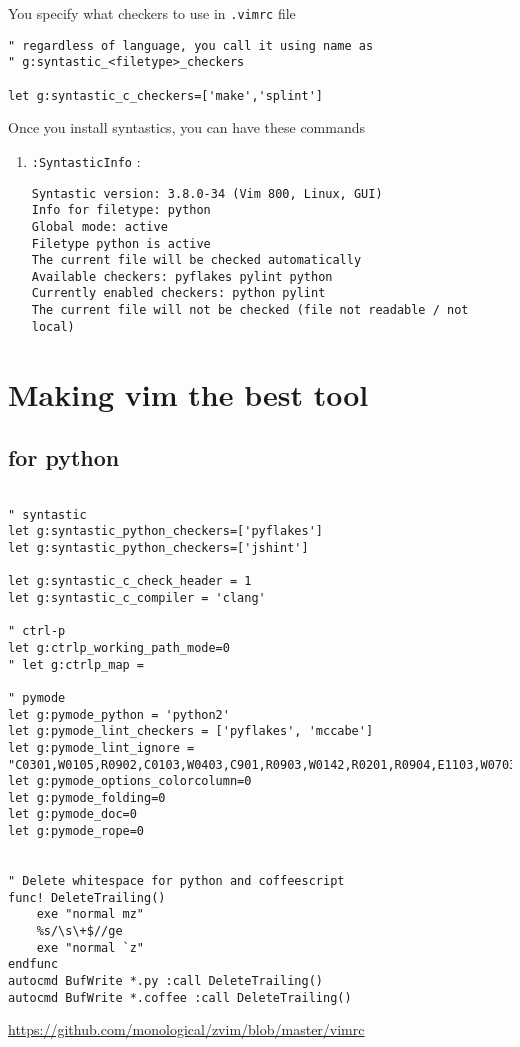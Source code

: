 You specify what checkers to use in \verb!.vimrc! file
\begin{verbatim}
" regardless of language, you call it using name as 
" g:syntastic_<filetype>_checkers

let g:syntastic_c_checkers=['make','splint']
\end{verbatim}

Once you install syntastics, you can have these commands

\begin{enumerate}
  \item \verb!:SyntasticInfo! : 

{\tiny 
\begin{verbatim}
Syntastic version: 3.8.0-34 (Vim 800, Linux, GUI)
Info for filetype: python
Global mode: active
Filetype python is active
The current file will be checked automatically
Available checkers: pyflakes pylint python
Currently enabled checkers: python pylint
The current file will not be checked (file not readable / not local)
\end{verbatim}
}  
  
  
\end{enumerate}

\section{Making vim the best tool}


\subsection{for python}
\begin{verbatim}

" syntastic
let g:syntastic_python_checkers=['pyflakes']
let g:syntastic_python_checkers=['jshint']

let g:syntastic_c_check_header = 1
let g:syntastic_c_compiler = 'clang'

" ctrl-p
let g:ctrlp_working_path_mode=0
" let g:ctrlp_map = 

" pymode
let g:pymode_python = 'python2'
let g:pymode_lint_checkers = ['pyflakes', 'mccabe']
let g:pymode_lint_ignore = "C0301,W0105,R0902,C0103,W0403,C901,R0903,W0142,R0201,R0904,E1103,W0703,W0221,C0323,E1101,R0914,E0611,F0401,R0915,E501,E203,W0232,W1001,W0122,W0511,W0104,R0912,W0621,W0223,W0201,W0612,C0302,I0011,R0901,W1201,W0622,R0913,E0702"
let g:pymode_options_colorcolumn=0
let g:pymode_folding=0
let g:pymode_doc=0
let g:pymode_rope=0


" Delete whitespace for python and coffeescript
func! DeleteTrailing()
    exe "normal mz"
    %s/\s\+$//ge
    exe "normal `z"
endfunc
autocmd BufWrite *.py :call DeleteTrailing()
autocmd BufWrite *.coffee :call DeleteTrailing()

\end{verbatim}
\url{https://github.com/monological/zvim/blob/master/vimrc}


